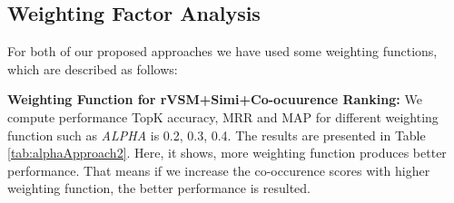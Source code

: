 \documentclass[conference]{IEEEtran}
\begin{document}
\subsection{Weighting Factor Analysis}
For both of our proposed approaches we have used some weighting functions, which are described as follows:

\textbf{Weighting Function for rVSM+Simi+Co-ocuurence Ranking:}
We compute performance TopK accuracy, MRR and MAP for different weighting function such as  \textit{ALPHA} is 0.2, 0.3, 0.4. The results are presented in Table \ref{tab:alphaApproach2}. Here, it shows, more weighting function produces better performance. That means if we increase the co-occurence scores with higher weighting function, the better performance is resulted. 
\begin{table}[htbp]
\centering
\caption{Performance of (rVSM+Simi+Co-Occerence) for different weighting factors}
\label{tab:alphaApproach1}
\end{table}
\end{document}
